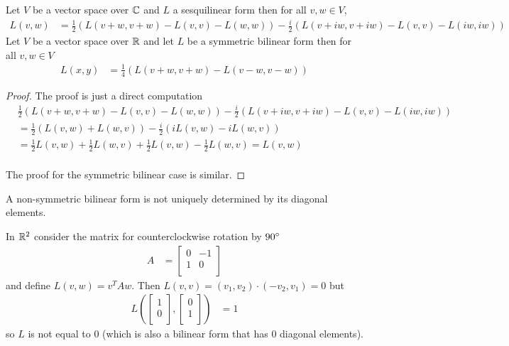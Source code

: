 \begin{prop}\label{hilbert:PolarizationIdentity}Let $V$ be a vector space over $\mathbb{C}$ and $L$ a sesquilinear form then for all $v,w \in V$,
\begin{align*}
L(v,w) &= \frac{1}{2} \left ( L(v+w, v+w) - L(v,v) - L(w,w) \right) - \frac{i}{2} \left ( L(v+iw, v+iw) - L(v,v) - L(iw,iw) \right) 
\end{align*}
Let $V$ be a vector space over $\mathbb{R}$ and let $L$ be a symmetric bilinear form then for all $v,w \in V$
\begin{align*}
L(x,y) &= \frac{1}{4} \left( L(v+w, v+w) - L(v-w, v-w) \right)
\end{align*}
\end{prop}
\begin{proof}
  The proof is just a direct computation
\begin{align*}
&\frac{1}{2} \left ( L(v+w, v+w) - L(v,v) - L(w,w) \right) - \frac{i}{2} \left ( L(v+iw, v+iw) - L(v,v) - L(iw,iw) \right) \\
&=\frac{1}{2} \left ( L(v,w) + L(w,v) \right) - \frac{i}{2} \left ( i L(v, w) - i L(w,v) \right) \\
&=\frac{1}{2}  L(v,w) + \frac{1}{2}  L(w,v)  + \frac{1}{2}  L(v, w) - \frac{1}{2}  L(w,v) = L(v,w) \\
\end{align*}

The proof for the symmetric bilinear case is similar.
\end{proof}

A non-symmetric bilinear form is not uniquely determined by its diagonal elements.
\begin{examp}In $\mathbb{R}^2$ consider the matrix for counterclockwise rotation by $90{\degree}$
\begin{align*}
A &= \begin{bmatrix} 
0 & -1 \\ 
1 & 0 \\
\end{bmatrix}
\end{align*}
and define $L(v,w) = v^T A w$.  Then $L(v,v) = (v_1,v_2) \cdot (-v_2, v_1) = 0$ but 
\begin{align*}
L \left( \begin{bmatrix} 
1 \\ 
0 \\
\end{bmatrix},
\begin{bmatrix} 
0 \\ 
1 \\
\end{bmatrix}
\right) &= 1
\end{align*}
so $L$ is not equal to $0$ (which is also a bilinear form that has $0$ diagonal elements).
\end{examp}

